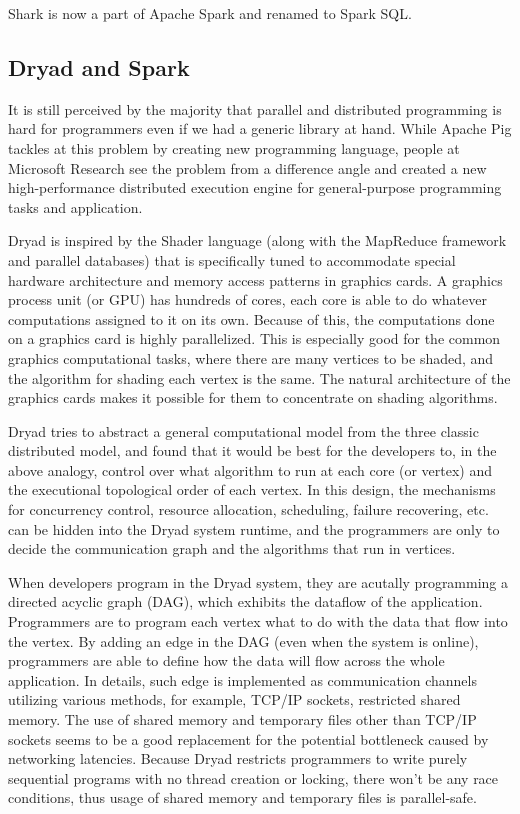 \documentclass{article}
\begin{document}
Shark is now a part of Apache Spark and renamed to Spark SQL.\cite{shark-homepage}

\subsection{Dryad and Spark}

It is still perceived by the majority that parallel and distributed programming is hard for programmers even if we had a generic library at hand. While Apache Pig tackles at this problem by creating new programming language, people at Microsoft Research see the problem from a difference angle and created a new high-performance distributed execution engine for general-purpose programming tasks and application.\cite{isard2007dryad}

Dryad is inspired by the Shader language (along with the MapReduce framework and parallel databases) that is specifically tuned to accommodate special hardware architecture and memory access patterns in graphics cards. A graphics process unit (or GPU) has hundreds of cores, each core is able to do whatever computations assigned to it on its own. Because of this, the computations done on a graphics card is highly parallelized. This is especially good for the common graphics computational tasks, where there are many vertices to be shaded, and the algorithm for shading each vertex is the same. The natural architecture of the graphics cards makes it possible for them to concentrate on shading algorithms.

Dryad tries to abstract a general computational model from the three classic distributed model, and found that it would be best for the developers to, in the above analogy, control over what algorithm to run at each core (or vertex) and the executional topological order of each vertex. In this design, the mechanisms for concurrency control, resource allocation, scheduling, failure recovering, etc. can be hidden into the Dryad system runtime, and the programmers are only to decide the communication graph and the algorithms that run in vertices.\cite{isard2007dryad}

When developers program in the Dryad system, they are acutally programming a directed acyclic graph (DAG), which exhibits the dataflow of the application. Programmers are to program each vertex what to do with the data that flow into the vertex. By adding an edge in the DAG (even when the system is online), programmers are able to define how the data will flow across the whole application. In details, such edge is implemented as communication channels utilizing various methods, for example, TCP/IP sockets, restricted shared memory.\cite{wiki:dryad} The use of shared memory and temporary files other than TCP/IP sockets seems to be a good replacement for the potential bottleneck caused by networking latencies. Because Dryad restricts programmers to write purely sequential programs with no thread creation or locking\cite{isard2007dryad}, there won't be any race conditions, thus usage of shared memory and temporary files is parallel-safe.
\end{document}
